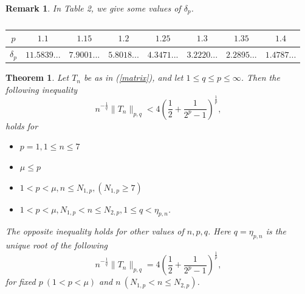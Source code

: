 \documentclass{amsart}
\newtheorem{theorem}{Theorem}
\newtheorem{remark}{Remark}
\begin{document}
\begin{remark} In Table 2, we give some values of $\delta_p$.
\begin{table}[ht!]
\centering
\begin{tabular}{ |c|c|c|c|c|c|c|c| } 
\hline
$p$ & $1.1$ & $1.15$ & $1.2$ & $1.25$ & $1.3$ & $1.35$ & $1.4$\\
\hline
$\delta_p$ & $11.5839...$ & $7.9001...$ & $5.8018...$ & $4.3471...$ & $3.2220...$ & $2.2895...$ & $1.4787...$ \\
\hline
\end{tabular}
\caption{}
\label{table:2}
\end{table}
\end{remark}
\begin{theorem}\label{mainthm2}
Let $T_n$ be as in (\ref{matrix}), and let $1\leq q \leq p\leq\infty$. Then the following inequality
\begin{equation}\label{mainthm2eq0}
 n^{-\frac{1}{q}}\|T_n\|_{p,q}<4\left(\frac{1}{2}+\frac{1}{2^p-1}\right)^{\frac{1}{p}},    
\end{equation}
holds for 
\begin{itemize}
    \item $p=1, 1\leq n\leq7$
    \item $\mu\leq p$
    \item $1<p<\mu, n\leq N_{1,p}, (N_{1,p}\geq 7)$
    \item $1<p<\mu, N_{1,p}<n\leq N_{2, p}, 1\leq q<\eta_{p,n}$.
\end{itemize} The opposite inequality holds for other values of $n, p, q$. Here $q=\eta_{p,n}$ is the unique root of the following
$$n^{-\frac{1}{q}}\|T_{n}\|_{p,q}= 4\left(\frac{1}{2}+\frac{1}{2^p-1}\right)^{\frac{1}{p}},$$
for fixed $p~(1<p<\mu)$ and $n~(N_{1,p}<n\leq N_{2,p})$.
\end{theorem}
\end{document}
